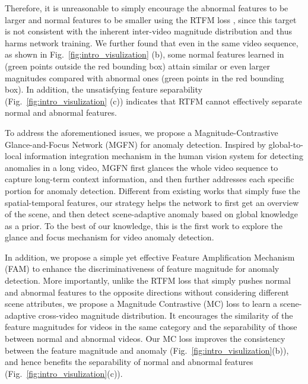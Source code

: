 \documentclass[letterpaper]{article} \usepackage{aaai23}  \usepackage{times}  \usepackage{helvet}  \usepackage{courier}  \usepackage[hyphens]{url}  \usepackage{graphicx} \urlstyle{rm} \def\UrlFont{\rm}  \usepackage{natbib}  \usepackage{caption} \frenchspacing  \setlength{\pdfpagewidth}{8.5in}  \setlength{\pdfpageheight}{11in}  \usepackage{algorithm}
\begin{document}
Therefore, it is unreasonable to simply encourage the abnormal features to be larger and normal features to be smaller using the RTFM loss \cite{RTFM}, since this target is not consistent with the inherent inter-video magnitude distribution and thus harms network training. 
We further found that even in the same video sequence, as shown in Fig.~\ref{fig:intro_visulization} (b), some normal features learned in \cite{RTFM} (green points outside the red bounding box) attain similar or even larger magnitudes compared with abnormal ones (green points in the red bounding box). In addition, the unsatisfying feature separability (Fig.~\ref{fig:intro_visulization} (c)) indicates that RTFM \cite{RTFM} cannot effectively separate normal and abnormal features. 

To address the aforementioned issues, we propose a Magnitude-Contrastive Glance-and-Focus Network (MGFN) for anomaly detection. Inspired by global-to-local information integration mechanism in the human vision system for detecting anomalies in a long video, MGFN first glances the whole video sequence to capture long-term context information, and then further addresses each specific portion for anomaly detection. Different from existing works that simply fuse the spatial-temporal features, our strategy helps the network to first get an overview of the scene, and then detect scene-adaptive anomaly based on global knowledge as a prior. To the best of our knowledge, this is the first work to explore the glance and focus mechanism for video anomaly detection. 


In addition, we propose a simple yet effective Feature Amplification Mechanism (FAM) to enhance the discriminativeness of feature magnitude for anomaly detection. More importantly, unlike the RTFM loss \cite{RTFM} that simply pushes normal and abnormal features to the opposite directions without considering different scene attributes, we propose a Magnitude Contrastive (MC) loss to learn a scene-adaptive cross-video magnitude distribution. It encourages the similarity of the feature magnitudes for videos in the same category and the separability of those between normal and abnormal videos. Our MC loss improves the consistency between the feature magnitude and anomaly (Fig.~\ref{fig:intro_visulization}(b)), and hence benefits the separability of normal and abnormal features (Fig.~\ref{fig:intro_visulization}(c)). 
\end{document}
